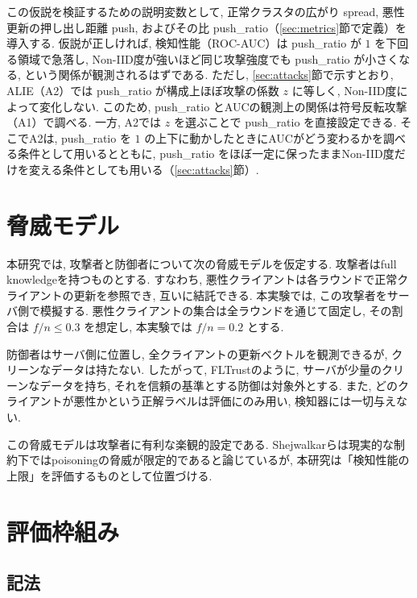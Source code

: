 \documentclass[a4j, twocolumn, dvipdfmx]{jsarticle}
\newcommand{\PushRatio}{\textrm{push\_ratio}}
\newcommand{\Spread}{\textrm{spread}}
\newcommand{\Push}{\textrm{push}}
\begin{document}
この仮説を検証するための説明変数として, 正常クラスタの広がり \Spread{}, 悪性更新の押し出し距離 \Push{}, およびその比 \PushRatio{}（\ref{sec:metrics}節で定義）を導入する. 仮説が正しければ, 検知性能（ROC-AUC）は \PushRatio{} が $1$ を下回る領域で急落し, Non-IID度が強いほど同じ攻撃強度でも \PushRatio{} が小さくなる, という関係が観測されるはずである. ただし, \ref{sec:attacks}節で示すとおり, ALIE（A2）では \PushRatio{} が構成上ほぼ攻撃の係数 $z$ に等しく, Non-IID度によって変化しない. このため, \PushRatio{} とAUCの観測上の関係は符号反転攻撃（A1）で調べる. 一方, A2では $z$ を選ぶことで \PushRatio{} を直接設定できる. そこでA2は, \PushRatio{} を $1$ の上下に動かしたときにAUCがどう変わるかを調べる条件として用いるとともに, \PushRatio{} をほぼ一定に保ったままNon-IID度だけを変える条件としても用いる（\ref{sec:attacks}節）.

\section{脅威モデル}
\label{sec:threat}

本研究では, 攻撃者と防御者について次の脅威モデルを仮定する. 攻撃者はfull knowledgeを持つものとする. すなわち, 悪性クライアントは各ラウンドで正常クライアントの更新を参照でき, 互いに結託できる. 本実験では, この攻撃者をサーバ側で模擬する. 悪性クライアントの集合は全ラウンドを通じて固定し, その割合は $f/n \le 0.3$ を想定し, 本実験では $f/n = 0.2$ とする.

防御者はサーバ側に位置し, 全クライアントの更新ベクトルを観測できるが, クリーンなデータは持たない. したがって, FLTrust\cite{cao2021fltrust}のように, サーバが少量のクリーンなデータを持ち, それを信頼の基準とする防御は対象外とする. また, どのクライアントが悪性かという正解ラベルは評価にのみ用い, 検知器には一切与えない.

この脅威モデルは攻撃者に有利な楽観的設定である. Shejwalkarら\cite{shejwalkar2022back}は現実的な制約下ではpoisoningの脅威が限定的であると論じているが, 本研究は「検知性能の上限」を評価するものとして位置づける.

\section{評価枠組み}
\label{sec:framework}

\subsection{記法}
\end{document}

